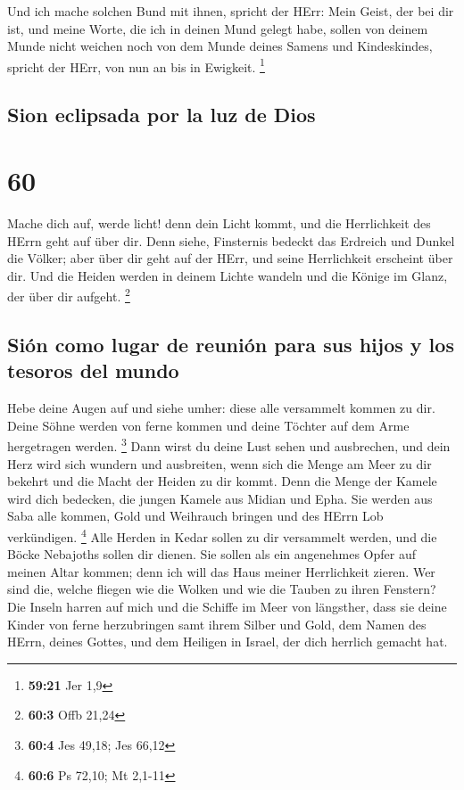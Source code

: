  Und ich mache solchen Bund mit ihnen, spricht der HErr:
Mein Geist, der bei dir ist, und meine Worte, die ich in deinen Mund
gelegt habe, sollen von deinem Munde nicht weichen noch von dem Munde
deines Samens und Kindeskindes, spricht der HErr, von nun an bis in
Ewigkeit. \footnote{\textbf{59:21} Jer 1,9}

\hypertarget{sion-eclipsada-por-la-luz-de-dios}{%
\subsection{Sion eclipsada por la luz de
Dios}\label{sion-eclipsada-por-la-luz-de-dios}}

\hypertarget{section-59}{%
\section{60}\label{section-59}}

 Mache dich auf, werde licht! denn dein Licht kommt, und
die Herrlichkeit des HErrn geht auf über dir.  Denn siehe,
Finsternis bedeckt das Erdreich und Dunkel die Völker; aber über dir
geht auf der HErr, und seine Herrlichkeit erscheint über dir.
 Und die Heiden werden in deinem Lichte wandeln und die
Könige im Glanz, der über dir aufgeht. \footnote{\textbf{60:3} Offb
  21,24}

\hypertarget{siuxf3n-como-lugar-de-reuniuxf3n-para-sus-hijos-y-los-tesoros-del-mundo}{%
\subsection{Sión como lugar de reunión para sus hijos y los tesoros del
mundo}\label{siuxf3n-como-lugar-de-reuniuxf3n-para-sus-hijos-y-los-tesoros-del-mundo}}

 Hebe deine Augen auf und siehe umher: diese alle
versammelt kommen zu dir. Deine Söhne werden von ferne kommen und deine
Töchter auf dem Arme hergetragen werden. \footnote{\textbf{60:4} Jes
  49,18; Jes 66,12}  Dann wirst du deine Lust sehen und
ausbrechen, und dein Herz wird sich wundern und ausbreiten, wenn sich
die Menge am Meer zu dir bekehrt und die Macht der Heiden zu dir kommt.
 Denn die Menge der Kamele wird dich bedecken, die jungen
Kamele aus Midian und Epha. Sie werden aus Saba alle kommen, Gold und
Weihrauch bringen und des HErrn Lob verkündigen. \footnote{\textbf{60:6}
  Ps 72,10; Mt 2,1-11}  Alle Herden in Kedar sollen zu dir
versammelt werden, und die Böcke Nebajoths sollen dir dienen. Sie sollen
als ein angenehmes Opfer auf meinen Altar kommen; denn ich will das Haus
meiner Herrlichkeit zieren.  Wer sind die, welche fliegen
wie die Wolken und wie die Tauben zu ihren Fenstern?  Die
Inseln harren auf mich und die Schiffe im Meer von längsther, dass sie
deine Kinder von ferne herzubringen samt ihrem Silber und Gold, dem
Namen des HErrn, deines Gottes, und dem Heiligen in Israel, der dich
herrlich gemacht hat.

